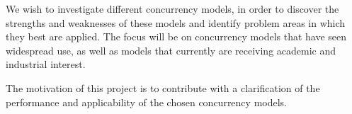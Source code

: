 We wish to investigate different concurrency models,  in order to discover the strengths and weaknesses of these models and identify problem areas in which they best are applied. The focus will be on concurrency models that have seen widespread use, as well as models that currently are receiving academic and industrial interest.

The motivation of this project is to contribute with a clarification of the performance and applicability of the chosen concurrency models.


 
\worksheetend
